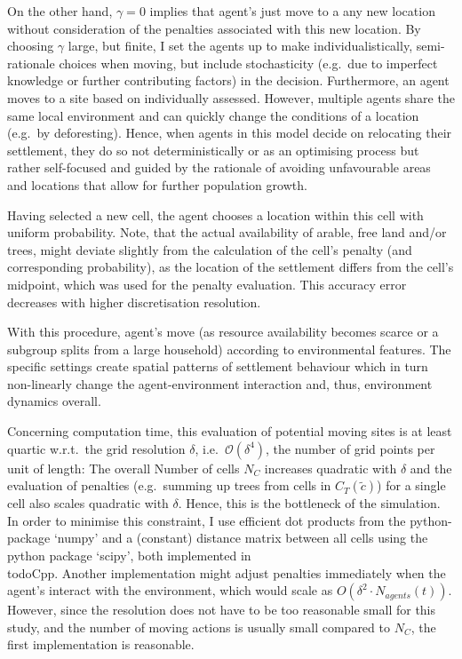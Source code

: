 On the other hand, $\gamma=0$ implies that agent's just move to a any new location without consideration of the penalties associated with this new location.
By choosing $\gamma$ large, but finite, I set the agents up to make individualistically, semi-rationale choices when moving, but include stochasticity (e.g.\ due to imperfect knowledge or further contributing factors) in the decision.
Furthermore, an agent moves to a site based on individually assessed.
However, multiple agents share the same local environment and can quickly change the conditions of a location (e.g.\ by deforesting). 
Hence, when agents in this model decide on relocating their settlement, they do so not deterministically or as an optimising process but rather self-focused and guided by the rationale of avoiding unfavourable areas and locations that allow for further population growth.

Having selected a new cell, the agent chooses a location within this cell with uniform probability.
Note, that the actual availability of arable, free land and/or trees, might deviate slightly from the calculation of the cell's penalty (and corresponding probability), as the location of the settlement differs from the cell's midpoint, which was used for the penalty evaluation.
This accuracy error decreases with higher discretisation resolution.



With this procedure, agent's move (as resource availability becomes scarce or a subgroup splits from a large household) according to environmental features. 
The specific settings create spatial patterns of settlement behaviour which in turn non-linearly change the agent-environment interaction and, thus, environment dynamics overall.

Concerning computation time, this evaluation of potential moving sites is at least quartic w.r.t.\ the grid resolution $\delta$, i.e.\ $\mathcal{O}(\delta^4)$, the number of grid points per unit of length: The overall Number of cells $N_C$ increases quadratic with $\delta$ and the evaluation of penalties (e.g.\ summing up trees from cells in $C_T(\tilde{c})$) for a single cell also scales quadratic with $\delta$. 
Hence, this is the bottleneck of the simulation. 
In order to minimise this constraint, I use efficient dot products from the python-package `numpy' and a (constant) distance matrix between all cells using the python package `scipy', both implemented in \\todo{Cpp}.
Another implementation might adjust penalties immediately when the agent's interact with the environment, which would scale as $O(\delta^2\cdot N_{agents}(t))$.
However, since the resolution does not have to be too reasonable small for this study, and the number of moving actions is usually small compared to $N_C$, the first implementation is reasonable.
	
